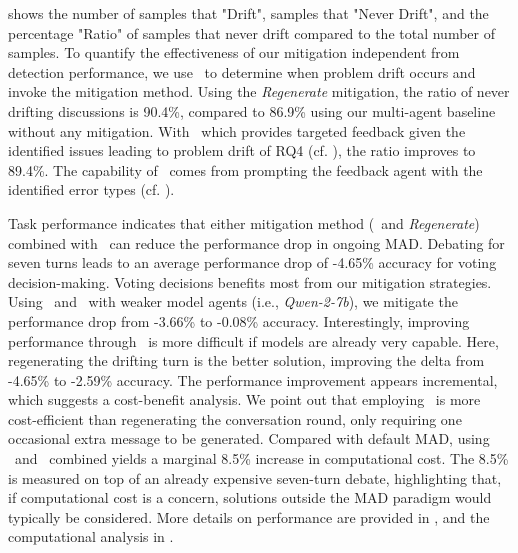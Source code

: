  shows the number of samples that "Drift", samples that "Never Drift", and the percentage "Ratio" of samples that never drift compared to the total number of samples.
To quantify the effectiveness of our mitigation independent from detection performance, we use \metric\ to determine when problem drift occurs and invoke the mitigation method.
Using the \textit{Regenerate} mitigation, the ratio of never drifting discussions is 90.4\%, compared to 86.9\% using our multi-agent baseline without any mitigation.
With \policy\, which provides targeted feedback given the identified issues leading to problem drift of RQ4 (cf. ), the ratio improves to 89.4\%.
The capability of \policy\ comes from prompting the feedback agent with the identified error types (cf. ).

Task performance indicates that either mitigation method (\policy\ and \textit{Regenerate}) combined with \judge\ can reduce the performance drop in ongoing MAD.
Debating for seven turns leads to an average performance drop of \mbox{-4.65\%} accuracy for voting decision-making.
Voting decisions benefits most from our mitigation strategies.
Using \judge\ and \policy\ with weaker model agents (i.e., \textit{Qwen-2-7b}), we mitigate the performance drop from -3.66\% to -0.08\% accuracy.
Interestingly, improving performance through \policy\ is more difficult if models are already very capable.
Here, regenerating the drifting turn is the better solution, improving the delta from -4.65\% to -2.59\% accuracy.
The performance improvement appears incremental, which suggests a cost-benefit analysis.
We point out that employing \policy\ is more cost-efficient than regenerating the conversation round, only requiring one occasional extra message to be generated.
Compared with default MAD, using \judge\ and \policy\ combined yields a marginal 8.5\% increase in computational cost.
The 8.5\% is measured on top of an already expensive seven-turn debate, highlighting that, if computational cost is a concern, solutions outside the MAD paradigm would typically be considered.
More details on performance are provided in , and the computational analysis in .

